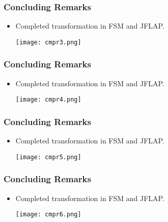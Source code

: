 \documentclass{beamer}
\begin{document}
\begin{frame}[fragile]
\frametitle{Concluding Remarks}
\begin{scriptsize}
\begin{itemize}

\item<1-> Completed transformation in FSM and JFLAP. \newline


\begin{center}
\texttt{[image: cmpr3.png]}
\end{center}


\end{itemize}
\end{scriptsize}
\end{frame}

\begin{frame}[fragile]
\frametitle{Concluding Remarks}
\begin{scriptsize}
\begin{itemize}

\item<1-> Completed transformation in FSM and JFLAP. \newline


\begin{center}
\texttt{[image: cmpr4.png]}
\end{center}


\end{itemize}
\end{scriptsize}
\end{frame}

\begin{frame}[fragile]
\frametitle{Concluding Remarks}
\begin{scriptsize}
\begin{itemize}

\item<1-> Completed transformation in FSM and JFLAP. \newline


\begin{center}
\texttt{[image: cmpr5.png]}
\end{center}


\end{itemize}
\end{scriptsize}
\end{frame}

\begin{frame}[fragile]
\frametitle{Concluding Remarks}
\begin{scriptsize}
\begin{itemize}

\item<1-> Completed transformation in FSM and JFLAP. \newline


\begin{center}
\texttt{[image: cmpr6.png]}
\end{center}


\end{itemize}
\end{scriptsize}
\end{frame}
\end{document}
